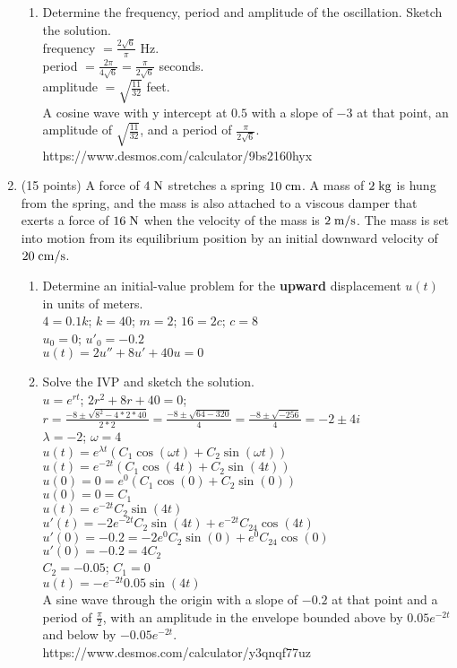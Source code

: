 \documentclass{article}
\begin{document}
\begin{enumerate}
\begin{enumerate}
\item
Determine the frequency, period and amplitude of the oscillation.  Sketch the solution.
\\frequency $=\frac{2\sqrt{6}}{\pi}$ Hz.
\\period $=\frac{2\pi}{4\sqrt{6}}=\frac{\pi}{2\sqrt{6}}$ seconds.
\\amplitude $=\sqrt{\frac{11}{32}}$ feet.
\\A cosine wave with y intercept at $0.5$ with a slope of $-3$ at that point, an amplitude of $\sqrt{\frac{11}{32}}$, and a period of $\frac{\pi}{2\sqrt{6}}$.
\\https://www.desmos.com/calculator/9bs2160hyx
\end{enumerate}


\bigskip
\item (15 points) A force of $4\;{\rm N}$ stretches a spring $10\;{\rm cm}$.  A mass of $2\;{\rm kg}$ is hung from the spring, and the mass is also attached to a viscous damper that exerts a force of $16\;{\rm N}$ when the velocity of the mass is $2\;{\rm m}/{\rm s}$.  The mass is set into motion from its equilibrium position by an initial downward velocity of $20\;{\rm cm}/{\rm s}$.
\begin{enumerate}
\item
Determine an initial-value problem for the {\bf upward} displacement $u(t)$ in units of meters.
\\$4=0.1k$; $k=40$; $m=2$; $16=2c$; $c=8$
\\$u_0=0$; $u'_0=-0.2$
\\$u(t)=2u''+8u'+40u=0$
\item
Solve the IVP and sketch the solution.
\\$u=e^{rt}$; $2r^2+8r+40=0$; $r=\frac{-8\pm\sqrt{8^2-4*2*40}}{2*2}=\frac{-8\pm\sqrt{64-320}}{4}=\frac{-8\pm\sqrt{-256}}{4}=-2\pm4i$
\\$\lambda=-2$; $\omega=4$
\\$u(t)=e^{\lambda t}(C_1\cos(\omega t)+C_2\sin(\omega t))$
\\$u(t)=e^{-2t}(C_1\cos(4t)+C_2\sin(4t))$
\\$u(0)=0=e^{0}(C_1\cos(0)+C_2\sin(0))$
\\$u(0)=0=C_1$
\\$u(t)=e^{-2t}C_2\sin(4t)$
\\$u'(t)=-2e^{-2t}C_2\sin(4t)+e^{-2t}C_24\cos(4t)$
\\$u'(0)=-0.2=-2e^{0}C_2\sin(0)+e^{0}C_24\cos(0)$
\\$u'(0)=-0.2=4C_2$
\\$C_2=-0.05$; $C_1=0$
\\$u(t)=-e^{-2t}0.05\sin(4t)$
\\A sine wave through the origin with a slope of $-0.2$ at that point and a period of $\frac{\pi}{2}$, with an amplitude in the envelope bounded above by $0.05e^{-2t}$ and below by $-0.05e^{-2t}$.
\\https://www.desmos.com/calculator/y3qnqf77uz
\end{enumerate}



\end{enumerate}
\end{document}
